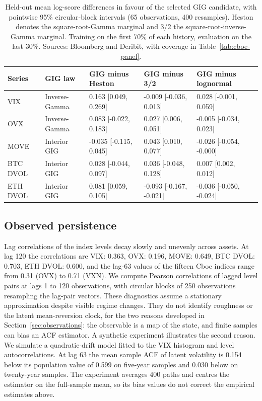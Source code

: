 \documentclass[11pt,a4paper]{article}
\theoremstyle{definition}
\theoremstyle{remark}
\newcommand{\ReplicationBlock}[2]{\ignorespaces}
\begin{document}
\begin{table}[htbp]\centering\small\setlength{\tabcolsep}{3pt}\begin{tabular}{@{}l P{24mm} P{36mm} P{36mm} P{36mm}@{}}\toprule Series & GIG law & GIG minus Heston & GIG minus 3/2 & GIG minus lognormal\\\midrule

VIX & Inverse-Gamma & 0.163 [0.049, 0.269] & -0.009 [-0.036, 0.013] & 0.028 [-0.001, 0.059] \\

OVX & Inverse-Gamma & 0.083 [-0.022, 0.183] & 0.027 [0.006, 0.051] & -0.005 [-0.034, 0.023] \\

MOVE & Interior GIG & -0.035 [-0.115, 0.045] & 0.043 [0.010, 0.077] & -0.026 [-0.054, -0.000] \\

BTC DVOL & Interior GIG & 0.028 [-0.044, 0.097] & 0.036 [-0.048, 0.128] & 0.007 [0.002, 0.012] \\

ETH DVOL & Interior GIG & 0.081 [0.059, 0.105] & -0.093 [-0.167, -0.021] & -0.036 [-0.050, -0.024] \\

\bottomrule\end{tabular}\caption{Held-out mean log-score differences in favour of the selected GIG candidate, with pointwise 95\% circular-block intervals (65 observations, 400 resamples). Heston denotes the square-root-Gamma marginal and 3/2 the square-root-inverse-Gamma marginal. Training on the first 70\% of each history, evaluation on the last 30\%. Sources: Bloomberg and Deribit, with coverage in Table~\ref{tab:cboe-panel}.}\label{tab:empirical-scores}\end{table}

\subsection{Observed persistence}
\label{sec:empirical-acf}
Lag correlations of the index levels decay slowly and unevenly across assets.
At lag 120 the correlations are VIX: 0.363, OVX: 0.196, MOVE: 0.649, BTC DVOL: 0.703, ETH DVOL: 0.600, and the lag-63 values of the fifteen Cboe indices range from 0.31 (OVX) to 0.71 (VXN). We compute Pearson correlations of lagged level pairs at lags 1 to 120
observations, with circular blocks of 250 observations resampling the lag-pair
vectors. These diagnostics assume a stationary approximation despite visible regime
changes. They do not identify roughness or the latent mean-reversion clock, for the
two reasons developed in Section~\ref{sec:observations}: the observable is a map of
the state, and finite samples can bias an ACF estimator.
A synthetic experiment illustrates the second reason. We simulate a quadratic-drift
model fitted to the VIX histogram and level autocorrelations. At lag 63 the mean
sample ACF of latent volatility is 0.154 below its population value of
0.599 on five-year samples and 0.030 below on twenty-year samples.
The experiment averages 400 paths and centres the estimator on the full-sample mean, so
its bias values do not correct the empirical estimates above.
\ReplicationBlock{end}{empirical_section.tex}
\end{document}
